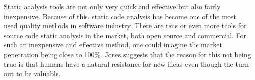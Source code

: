 Static analysis tools are not only very quick and effective but also fairly inexpensive. Because of this, static code analysis has become one of the most used quality methods in software industry. There are tens or even more tools for source code static analysis in the market, both open source and commercial. For such an inexpensive and effective method, one could imagine the market penetration being close to 100\%. Jones suggests that the reason for this not being true is that humans have a natural resistance for new ideas even though the turn out to be valuable.




